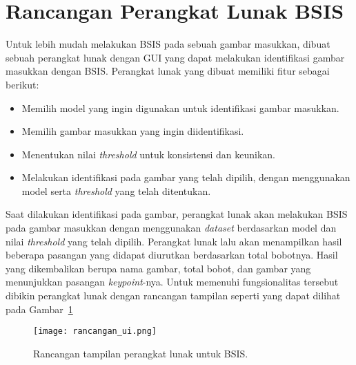 \section{Rancangan Perangkat Lunak BSIS}
\label{sec:rancangan_perangkat_lunak_bsis}
Untuk lebih mudah melakukan BSIS pada sebuah gambar masukkan, dibuat sebuah perangkat lunak dengan GUI yang dapat melakukan identifikasi gambar masukkan dengan BSIS. Perangkat lunak yang dibuat memiliki fitur sebagai berikut:
\begin{itemize}
	\item Memilih model yang ingin digunakan untuk identifikasi gambar masukkan.
	\item Memilih gambar masukkan yang ingin diidentifikasi.
	\item Menentukan nilai \textit{threshold} untuk konsistensi dan keunikan.
	\item Melakukan identifikasi pada gambar yang telah dipilih, dengan menggunakan model serta \textit{threshold} yang telah ditentukan.
\end{itemize}
Saat dilakukan identifikasi pada gambar, perangkat lunak akan melakukan BSIS pada gambar masukkan dengan menggunakan \textit{dataset} berdasarkan model dan nilai \textit{threshold} yang telah dipilih. Perangkat lunak lalu akan menampilkan hasil beberapa pasangan yang didapat diurutkan berdasarkan total bobotnya. Hasil yang dikembalikan berupa nama gambar, total bobot, dan gambar yang menunjukkan pasangan \textit{keypoint}-nya. Untuk memenuhi fungsionalitas tersebut dibikin perangkat lunak dengan rancangan tampilan seperti yang dapat dilihat pada Gambar~\ref{fig:rancangan_ui}
\begin{figure}[H]
	\centering
	\texttt{[image: rancangan\_ui.png]}
	\caption{Rancangan tampilan perangkat lunak untuk BSIS.}
	\label{fig:rancangan_ui}
\end{figure}

